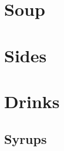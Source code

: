 \documentclass{family_cookbook}
\begin{document}
\chapter{Soup}
\minitoc
\clearpage






\chapter{Sides}
\minitoc
\clearpage




\chapter{Drinks}
\minitoc
\clearpage
\section{Syrups}
{
	\let\section\subsection
	\let\subsection\subsubsection
	
	
	
	
	
	

}


\end{document}
